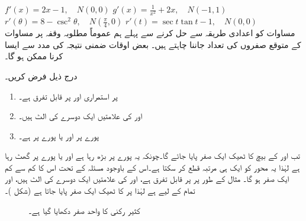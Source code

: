 $f'(x)=2x-1,\quad N(0,0)$
$g'(x)=\tfrac{1}{x^2}+2x,\quad N(-1,1)$
$r'(\theta)=8-\csc^2\theta,\quad N(\tfrac{\pi}{4},0)$
$r'(t)=\sec t\tan t-1,\quad N(0,0)$
\\
مساوات  کو اعدادی طریقہ سے حل کرنے سے پہلے ہم عموماً  مطلوبہ وقفہ پر  مساوات کے  متوقع صفروں کی تعداد جاننا چاہتے ہیں۔ بعض اوقات ضمنی نتیجہ  کی مدد سے ایسا کرنا ممکن ہو گا۔

درج ذیل فرض کریں۔
\begin{enumerate}[1.]
\item
{} پر  استمراری اور  پر قابل تفرق ہے۔
\item
{} اور  کی علامتیں ایک دوسرے کی الٹ ہیں۔
\item
پورے  پر  اور یا پورے  پر  ہے۔
\end{enumerate}
تب  اور  کے بیچ  کا ٹھیک ایک صفر پایا جائے گا۔چونکہ یہ پورے  پر بڑھ رہا ہے اور یا  پورے  پر گھٹ رہا ہے لہٰذا یہ محور  کو ایک ہی مرتبہ قطع کر سکتا ہے۔اس کے باوجود مسئلہ  کے تحت اس کا کم سے کم ایک صفر ہو گا۔ مثال کے طور پر  پر  قابل تفرق ہے،  اور  کی علامتیں ایک دوسرے کی الٹ ہیں، اور تمام  کے لیے  ہے  لہٰذا  پر  کا ٹھیک ایک صفر پایا جاتا ہے (شکل )۔
\begin{figure}
\centering
{}
\caption{کثیر رکنی  کا واحد صفر دکھایا گیا ہے۔}
\label{شکل_استعمال_یک_صفر_مثال}
\end{figure}

